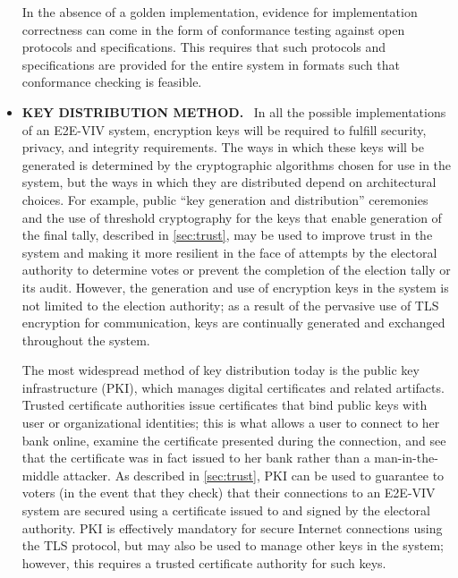 \begin{itemize}
  In the absence of a golden implementation, evidence for
  implementation correctness can come in the form of conformance
  testing against open protocols and specifications. This requires
  that such protocols and specifications are provided for the entire
  system in formats such that conformance checking is feasible.

\item \textbf{KEY DISTRIBUTION METHOD.} \ In all the possible
  implementations of an E2E-VIV system, encryption keys will be
  required to fulfill security, privacy, and integrity
  requirements. The ways in which these keys will be generated is
  determined by the cryptographic algorithms chosen for use in the
  system, but the ways in which they are distributed depend on
  architectural choices. For example, public ``key generation and
  distribution'' ceremonies and the use of threshold cryptography for
  the keys that enable generation of the final tally, described in
  \autoref{sec:trust}, may be used to improve trust in the system and
  making it more resilient in the face of attempts by the electoral
  authority to determine votes or prevent the completion of the
  election tally or its audit. However, the generation and use of
  encryption keys in the system is not limited to the election
  authority; as a result of the pervasive use of TLS encryption for
  communication, keys are continually generated and exchanged
  throughout the system.

  The most widespread method of key distribution today is the public
  key infrastructure (PKI), which manages digital certificates and
  related artifacts. Trusted certificate authorities issue
  certificates that bind public keys with user or organizational
  identities; this is what allows a user to connect to her bank
  online, examine the certificate presented during the connection, and
  see that the certificate was in fact issued to her bank rather than
  a man-in-the-middle attacker. As described in \autoref{sec:trust},
  PKI can be used to guarantee to voters (in the event that they
  check) that their connections to an E2E-VIV system are secured using
  a certificate issued to and signed by the electoral authority. PKI
  is effectively mandatory for secure Internet connections using the
  TLS protocol, but may also be used to manage other keys in the
  system; however, this requires a trusted certificate authority for
  such keys. 


\end{itemize}
